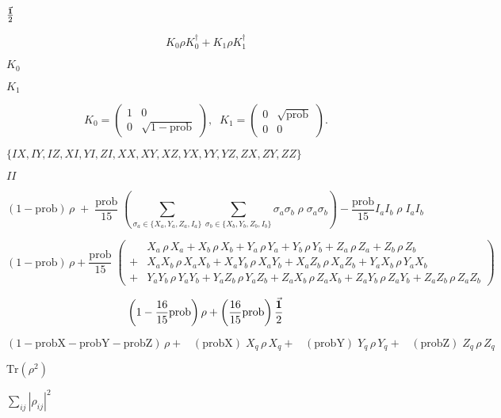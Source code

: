 \documentclass{article}
\begin{document}
$ \frac{\vec{\bf{1}}}{2} $
\pagebreak

\[
 K_0 \rho K_0^\dagger + K_1 \rho K_1^\dagger
\]
\pagebreak

$K_0$
\pagebreak

$K_1$
\pagebreak

\[
     K_0 = \begin{pmatrix} 1 & 0 \\ 0 & \sqrt{1-\text{prob}} \end{pmatrix}, \;\;
     K_1 = \begin{pmatrix} 0 & \sqrt{\text{prob}} \\ 0 & 0 \end{pmatrix}.
\]
\pagebreak

$\{ IX, IY, IZ, XI, YI, ZI, XX, XY, XZ, YX, YY, YZ, ZX, ZY, ZZ \}$
\pagebreak

$II$
\pagebreak

\[
(1 - \text{prob}) \, \rho \; + \; \frac{\text{prob}}{15} \; \left( 
     \sum \limits_{\sigma_a \in \{X_a,Y_a,Z_a,I_a\}}
     \sum \limits_{\sigma_b \in \{X_b,Y_b,Z_b,I_b\}}
     \sigma_a \sigma_b \; \rho \; \sigma_a \sigma_b
\right)
- \frac{\text{prob}}{15} I_a I_b \; \rho \; I_a I_b
\]
\pagebreak

\[
(1 - \text{prob}) \, \rho + \frac{\text{prob}}{15} \; \left( 
\begin{aligned}
     &X_a \, \rho \, X_a + 
     X_b \, \rho \, X_b + 
     Y_a \, \rho \, Y_a + 
     Y_b \, \rho \, Y_b + 
     Z_a \, \rho \, Z_a + 
     Z_b \, \rho \, Z_b 
  \\
   + &X_a X_b \, \rho \, X_a X_b +
     X_a Y_b \, \rho \, X_a Y_b +
     X_a Z_b \, \rho \, X_a Z_b +
     Y_a X_b \, \rho \, Y_a X_b
\\
  + &Y_a Y_b \, \rho \, Y_a Y_b +
     Y_a Z_b \, \rho \, Y_a Z_b +
     Z_a X_b \, \rho \, Z_a X_b + 
     Z_a Y_b \, \rho \, Z_a Y_b + 
     Z_a Z_b \, \rho \, Z_a Z_b
\end{aligned}
\right)
\]
\pagebreak

\[ 
     \left( 1 - \frac{16}{15} \text{prob} \right) \rho + \left( \frac{16}{15} \text{prob} \right) \frac{\vec{\bf{1}}}{2}
\]
\pagebreak

\[
(1 - \text{probX} - \text{probY} - \text{probZ}) \, \rho + \;\;\;
     (\text{probX})\; X_q \, \rho \, X_q + \;\;\;
     (\text{probY})\; Y_q \, \rho \, Y_q + \;\;\;
     (\text{probZ})\; Z_q \, \rho \, Z_q
\]
\pagebreak

$\text{Tr}(\rho^2)$
\pagebreak

$\sum_{ij} |\rho_{ij}|^2 $
\pagebreak
\end{document}
